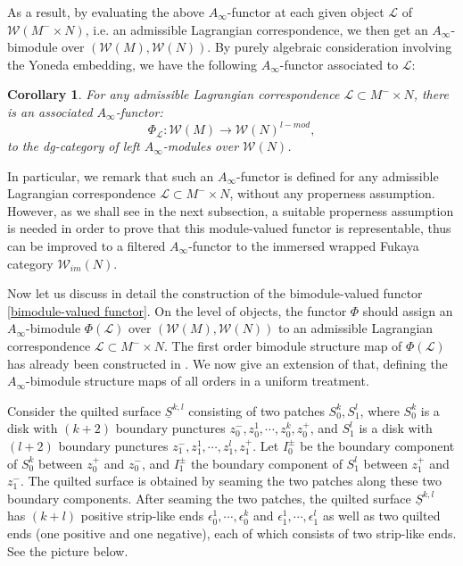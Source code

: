 \documentclass{amsart}
\newtheorem{corollary}[theorem]{Corollary}
\numberwithin{equation}{section}
\numberwithin{figure}{section}
\begin{document}
	As a result, by evaluating the above $A_{\infty}$-functor at each given object $\mathcal{L}$ of $\mathcal{W}(M^{-} \times N)$, i.e. an admissible Lagrangian correspondence, we then get an $A_{\infty}$-bimodule over $(\mathcal{W}(M), \mathcal{W}(N))$. By purely algebraic consideration involving the Yoneda embedding, we have the following $A_{\infty}$-functor associated to $\mathcal{L}$: \par

\begin{corollary}
	For any admissible Lagrangian correspondence $\mathcal{L} \subset M^{-} \times N$, there is an associated $A_{\infty}$-functor:
\begin{equation} \label{functor to modules}
\Phi_{\mathcal{L}}: \mathcal{W}(M) \to \mathcal{W}(N)^{l-mod},
\end{equation}
to the dg-category of left $A_{\infty}$-modules over $\mathcal{W}(N)$. 
\end{corollary}

	In particular, we remark that such an $A_{\infty}$-functor is defined for any admissible Lagrangian correspondence $\mathcal{L} \subset M^{-} \times N$, without any properness assumption. However, as we shall see in the next subsection, a suitable properness assumption is needed in order to prove that this module-valued functor is representable, thus can be improved to a filtered $A_{\infty}$-functor to the immersed wrapped Fukaya category $\mathcal{W}_{im}(N)$. \par
	Now let us discuss in detail the construction of the bimodule-valued functor \eqref{bimodule-valued functor}. On the level of objects, the functor $\Phi$ should assign an $A_{\infty}$-bimodule $\Phi(\mathcal{L})$ over $(\mathcal{W}(M), \mathcal{W}(N))$ to an admissible Lagrangian correspondence $\mathcal{L} \subset M^{-} \times N$. The first order bimodule structure map of $\Phi(\mathcal{L})$ has already been constructed in \cite{Gao1}. We now give an extension of that, defining the $A_{\infty}$-bimodule structure maps of all orders in a uniform treatment. \par
	Consider the quilted surface $\underline{S}^{k, l}$ consisting of two patches $S^{k}_{0}, S^{l}_{1}$, where $S^{k}_{0}$ is a disk with $(k+2)$ boundary punctures $z_{0}^{-}, z_{0}^{1}, \cdots, z_{0}^{k}, z_{0}^{+}$, and $S^{l}_{1}$ is a disk with $(l+2)$ boundary punctures $z_{1}^{-}, z_{1}^{1}, \cdots, z_{1}^{l}, z_{1}^{+}$. Let $I_{0}^{\pm}$ be the boundary component of $S^{k}_{0}$ between $z_{0}^{+}$ and $z_{0}^{-}$, and $I_{1}^{\pm}$ the boundary component of $S^{l}_{1}$ between $z_{1}^{+}$ and $z_{1}^{-}$. The quilted surface is obtained by seaming the two patches along these two boundary components. After seaming the two patches, the quilted surface $\underline{S}^{k, l}$ has $(k+l)$ positive strip-like ends $\epsilon_{0}^{1}, \cdots, \epsilon_{0}^{k}$ and $\epsilon_{1}^{1}, \cdots, \epsilon_{1}^{l}$ as well as two quilted ends (one positive and one negative), each of which consists of two strip-like ends. See the picture below. \par
\end{document}
